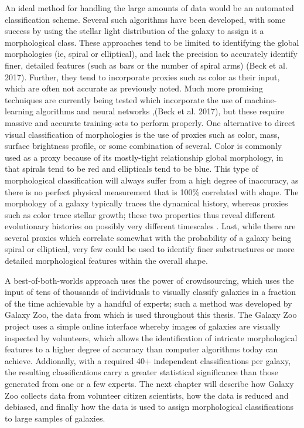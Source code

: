 An ideal method for handling the large amounts of data would be an automated classification scheme. Several such algorithms have been developed, with some success \citep{Odewahn2002,Peng2002,Conselice2003,Scarlata2007} by using the stellar light distribution of the galaxy to assign it a morphological class. These approaches tend to be limited to identifying the global morphologies (ie, spiral or elliptical), and lack the precision to accurately identify finer, detailed features (such as bars or the number of spiral arms) (Beck et al. 2017). Further, they tend to incorporate proxies such as color as their input, which are often not accurate as previously noted. Much more promising techniques are currently being tested which incorporate the use of machine-learning algorithms and neural networks \citep{Dieleman2015, Huertas-Company2015},(Beck et al. 2017), but these require massive and accurate training-sets to perform properly. 
One alternative to direct visual classification of morphologies is the use of proxies such as color, mass, surface brightness profile, or some combination of several. Color is commonly used as a proxy because of its mostly-tight relationship global morphology, in that spirals tend to be red and ellipticals tend to be blue. This type of morphological classification will always suffer from a high degree of inaccuracy, as there is no perfect physical measurement that is 100\% correlated with shape. The morphology of a galaxy typically traces the dynamical history, whereas proxies such as color trace stellar growth; these two properties thus reveal different evolutionary histories on possibly very different timescales \citep{Fortson2012}. Last, while there are several proxies which correlate somewhat with the probability of a galaxy being spiral or elliptical, very few could be used to identify finer substructures or more detailed morphological features within the overall shape. 

A best-of-both-worlds approach uses the power of crowdsourcing, which uses the input of tens of thousands of individuals to visually classify galaxies in a fraction of the time achievable by a handful of experts; such a method was developed by Galaxy Zoo, the data from which is used throughout this thesis. The Galaxy Zoo project uses a simple online interface whereby images of galaxies are visually inspected by volunteers, which allows the identification of intricate morphological features to a higher degree of accuracy than computer algorithms today can achieve. Addionally, with a required 40+ independent classifications per galaxy, the resulting classifications carry a greater statistical significance than those generated from one or a few experts. The next chapter will describe how Galaxy Zoo collects data from volunteer citizen scientists, how the data is reduced and debiased, and finally how the data is used to assign morphological classifications to large samples of galaxies.  








